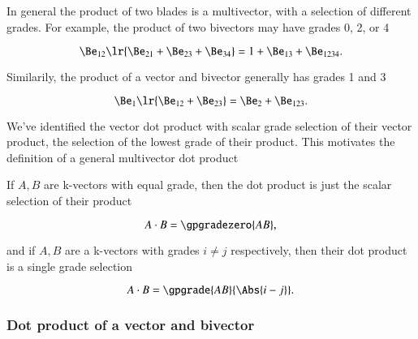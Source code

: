 %
%

In general the product of two blades is a multivector, with a selection of different grades.
For example, the product of two bivectors may have grades 0, 2, or 4

\begin{dmath}\label{eqn:generalizedDot:601}
\Be_{12} \lr{ \Be_{21} + \Be_{23} + \Be_{34} }
=
1 + \Be_{13} + \Be_{1234}.
\end{dmath}

Similarily,
the product of a vector and bivector generally has grades 1 and 3

\begin{dmath}\label{eqn:generalizedDot:621}
\Be_1 \lr{ \Be_{12} + \Be_{23} }
=
\Be_2 + \Be_{123}.
\end{dmath}

We've identified the vector dot product with scalar grade selection of their vector product, the selection of the lowest grade of their product.
This motivates the definition of a general multivector dot product


If \( A, B \) are k-vectors with equal grade, then the dot product is just the scalar selection of their product

\begin{dmath}\label{eqn:generalizedDot:580}
A \cdot B = \gpgradezero{ A B },
\end{dmath}

and if \( A, B \) are a k-vectors with grades \( i \ne j \) respectively, then their dot product is a single grade selection

\begin{dmath}\label{eqn:generalizedDot:581}
A \cdot B = \gpgrade{ A B }{\Abs{i - j}}.
\end{dmath}

\subsubsection{Dot product of a vector and bivector}

